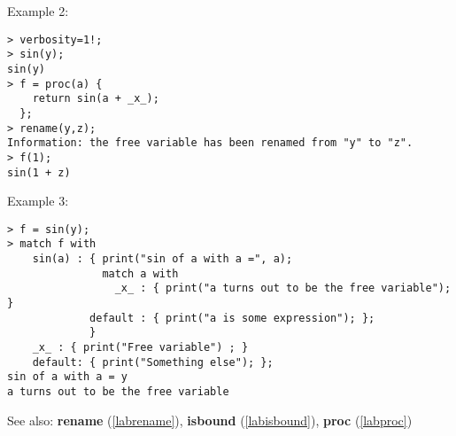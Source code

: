 \noindent Example 2: 
\begin{center}\begin{minipage}{15cm}\begin{Verbatim}[frame=single,commandchars=\\\|\~]
> verbosity=1!;
> sin(y);
sin(y)
> f = proc(a) {
    return sin(a + _x_);
  };
> rename(y,z);
Information: the free variable has been renamed from "y" to "z".
> f(1);
sin(1 + z)
\end{Verbatim}
\end{minipage}\end{center}
\noindent Example 3: 
\begin{center}\begin{minipage}{15cm}\begin{Verbatim}[frame=single,commandchars=\\\|\~]
> f = sin(y);
> match f with
    sin(a) : { print("sin of a with a =", a);
               match a with
                 _x_ : { print("a turns out to be the free variable"); }
             default : { print("a is some expression"); };
             }
    _x_ : { print("Free variable") ; }
    default: { print("Something else"); };
sin of a with a = y
a turns out to be the free variable
\end{Verbatim}
\end{minipage}\end{center}
See also: \textbf{rename} (\ref{labrename}), \textbf{isbound} (\ref{labisbound}), \textbf{proc} (\ref{labproc})
